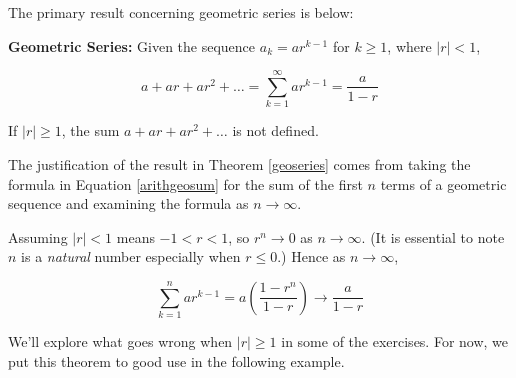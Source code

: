 The primary result concerning geometric series is below:

\smallskip

\colorbox{ResultColor}{\bbm

\begin{thm}  \label{geoseries} \textbf{Geometric Series:} Given the sequence $a_{k} = ar^{k-1}$ for $k \geq 1$, where $|r| < 1$,

\[ a + ar + ar^2 + \ldots = \displaystyle{\sum_{k=1}^{\infty} ar^{k-1}} = \dfrac{a}{1-r}\]

If $|r| \geq 1$, the sum $a + ar + ar^2 + \ldots $ is not defined. 

\end{thm}

\ebm}

\smallskip

The justification of the result in Theorem \ref{geoseries} comes from taking the formula in Equation \ref{arithgeosum} for the sum of the first $n$ terms of a geometric sequence and examining the formula as $n \rightarrow \infty$.  

Assuming $|r|<1$ means $-1 < r < 1$, so $r^{n} \rightarrow 0$ as $n \rightarrow \infty$.  (It is essential to note $n$ is a \textit{natural} number especially when $r \leq 0$.) Hence as $n \rightarrow \infty$,

\[\displaystyle{\sum_{k=1}^{n} a r^{k-1}} = a \left( \dfrac{1-r^n}{1-r}\right) \rightarrow \dfrac{a}{1-r} \]

We'll explore what goes wrong when $|r| \geq 1$ in some of the exercises. For now, we put this theorem to good use in the following example.

